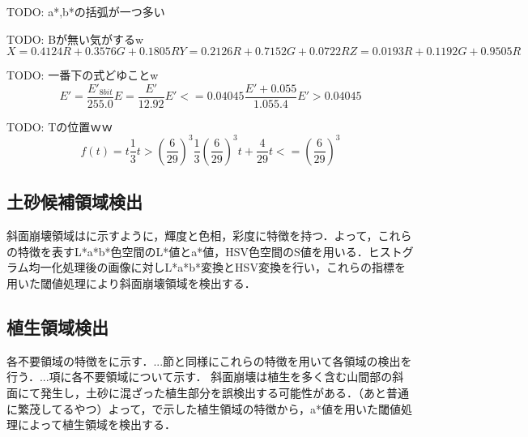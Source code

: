       TODO: a*,b*の括弧が一つ多い

      TODO: Bが無い気がするw
      \begin{equation}
        \label{Lab表色系2}
        X = 0.4124R + 0.3576G + 0.1805R
        Y = 0.2126R + 0.7152G + 0.0722R
        Z = 0.0193R + 0.1192G + 0.9505R
      \end{equation}

      TODO: 一番下の式どゆことw
      \begin{equation}
        \label{Lab表色系3}
        E' = \dfrac{E'_{8bit}} {255.0}
        E = \dfrac{E'} {12.92}
          E' <= 0.04045
        \dfrac{E' + 0.055} {1.055.4}
          E' > 0.04045
      \end{equation}

      TODO: Tの位置ｗｗ
      \begin{equation}
        \label{Lab表色系4}
        f(t) = 
          t \dfrac{1} {3} 
            t > (\dfrac{6} {29})^3
          \dfrac{1} {3} (\dfrac{6} {29})^3 t + \dfrac{4} {29}
            t <= (\dfrac{6} {29})^3
      \end{equation}

    \subsection{土砂候補領域検出}
      斜面崩壊領域は\tref{}に示すように，輝度と色相，彩度に特徴を持つ．よって，これらの特徴を表すL*a*b*色空間のL*値とa*値，HSV色空間のS値を用いる．ヒストグラム均一化処理後の画像に対しL*a*b*変換とHSV変換を行い，これらの指標を用いた閾値処理により斜面崩壊領域を検出する．

    \subsection{植生領域検出}
      \label{植生除去}
      各不要領域の特徴を\Fref{}に示す．...節と同様にこれらの特徴を用いて各領域の検出を行う．...項に各不要領域について示す．
      斜面崩壊は植生を多く含む山間部の斜面にて発生し，土砂に混ざった植生部分を誤検出する可能性がある．（あと普通に繁茂してるやつ）よって，\Fref{}で示した植生領域の特徴から，a*値を用いた閾値処理によって植生領域を検出する．


